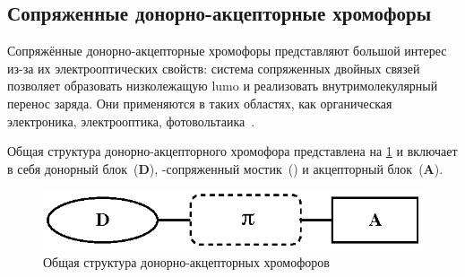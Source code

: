 


\subsection{Сопряженные донорно-акцепторные хромофоры}

Сопряжённые донорно-акцепторные хромофоры представляют большой интерес из-за их электрооптических свойств: система сопряженных двойных связей позволяет образовать низколежащую \ac{lumo} и реализовать внутримолекулярный перенос заряда. Они применяются в таких областях, как органическая электроника, электрооптика, фотовольтаика~\cite{Bures2014a}.

Общая структура донорно-акцепторного хромофора представлена на \ref{fig:D-p-A_chromophores} и включает в себя донорный блок~(\textbf{D}), \chempi-сопряженный мостик~({\Large\chempi}) и акцепторный блок~(\textbf{A}).
\begin{figure}
    \centering
    \includegraphics{sections/literature/img/D-p-A_chromophores.eps}
    \caption{Общая структура донорно-акцепторных хромофоров}
    \label{fig:D-p-A_chromophores}
\end{figure}

